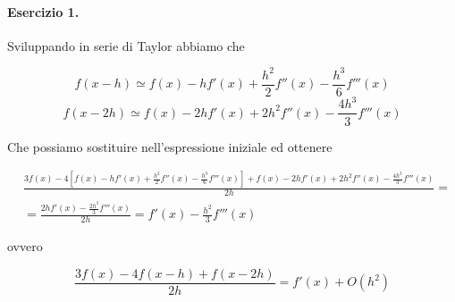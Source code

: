 \paragraph{Esercizio 1.} Sviluppando in serie di Taylor abbiamo che

\[ f(x-h) \simeq f(x) - hf'(x) + \frac{h^2}{2}f''(x) - \frac{h^3}{6}f'''(x) \]
\[ f(x-2h) \simeq f(x) - 2hf'(x) + 2h^2f''(x) - \frac{4h^3}{3}f'''(x) \]

Che possiamo sostituire nell'espressione iniziale ed ottenere

\[
\begin{split}
& \frac{3f(x) - 4\left[f(x) - hf'(x) + \frac{h^2}{2}f''(x) - \frac{h^3}{6}f'''(x)\right] + f(x) - 2hf'(x) + 2h^2f''(x) - \frac{4h^3}{3}f'''(x)}{2h} =  \\
& = \frac{2hf'(x) - \frac{2h^3}{3}f'''(x)}{2h} = f'(x) - \frac{h^2}{3}f'''(x)
\end{split}
\]

ovvero

\[ \frac{3f(x) - 4f(x-h) + f(x-2h)}{2h} = f'(x) + O(h^2) \]
